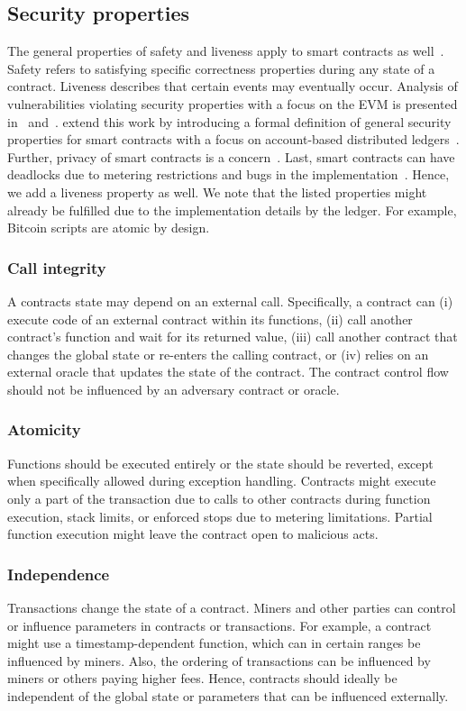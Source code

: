 \subsection{Security properties}
The general properties of safety and liveness apply to smart contracts as well~\cite{Sergey2018}.
Safety refers to satisfying specific correctness properties during any state of a contract.
Liveness describes that certain events may eventually occur.
Analysis of vulnerabilities violating security properties with a focus on the EVM is presented in~\cite{Luu2016} and~\cite{Atzei2017}.
\citeauthor{Grishchenko2018} extend this work by introducing a formal definition of general security properties for smart contracts with a focus on account-based distributed ledgers~\cite{Grishchenko2018}.
Further, privacy of smart contracts is a concern~\cite{Kosba2015,Bowe2018,Covaci2018}.
Last, smart contracts can have deadlocks due to metering restrictions and bugs in the implementation~\cite{Grech2018}.
Hence, we add a liveness property as well.
We note that the listed properties might already be fulfilled due to the implementation details by the ledger. 
For example, Bitcoin scripts are atomic by design.

\subsubsection{Call integrity}
A contracts state may depend on an external call. Specifically, a contract can (i) execute code of an external contract within its functions, (ii) call another contract's function and wait for its returned value, (iii) call another contract that changes the global state or re-enters the calling contract, or (iv) relies on an external oracle that updates the state of the contract.
The contract control flow should not be influenced by an adversary contract or oracle.

\subsubsection{Atomicity}
Functions should be executed entirely or the state should be reverted, except when specifically allowed during exception handling.
Contracts might execute only a part of the transaction due to calls to other contracts during function execution, stack limits, or enforced stops due to metering limitations.
Partial function execution might leave the contract open to malicious acts.

\subsubsection{Independence}
Transactions change the state of a contract. Miners and other parties can control or influence parameters in contracts or transactions. For example, a contract might use a timestamp-dependent function, which can in certain ranges be influenced by miners. Also, the ordering of transactions can be influenced by miners or others paying higher fees. Hence, contracts should ideally be independent of the global state or parameters that can be influenced externally.

